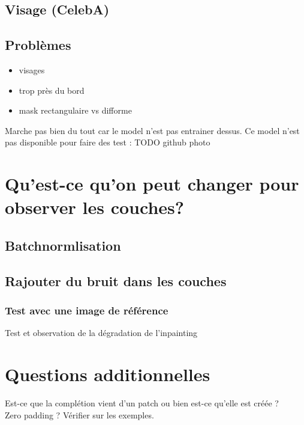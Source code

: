 \documentclass[12pt]{article}
\begin{document}
\subsection{Visage (CelebA)}

\subsection{Problèmes}
\begin{itemize}
    \item visages
    \item trop près du bord
    \item mask rectangulaire vs difforme
\end{itemize}

Marche pas bien du tout car le model n'est pas entrainer dessus.
Ce model n'est pas disponible pour faire des test : TODO github photo

\section{Qu'est-ce qu'on peut changer pour observer les couches?}

\subsection{Batchnormlisation}


\subsection{Rajouter du bruit dans les couches}

\subsubsection{Test avec une image de référence}
Test et observation de la dégradation de l'inpainting

\section{Questions additionnelles}

Est-ce que la complétion vient d'un patch ou bien est-ce qu'elle est créée ? \\
Zero padding ? Vérifier sur les exemples.\\




\end{document}
